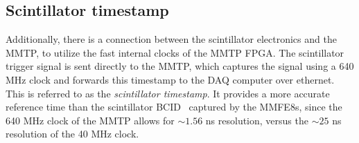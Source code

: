 \subsection{Scintillator timestamp}
\label{sec:exp-scitime}

Additionally, there is a connection between the scintillator electronics and the MMTP, to utilize the fast internal clocks of the MMTP FPGA. The scintillator trigger signal is sent directly to the MMTP, which captures the signal using a 640 MHz clock and forwards this timestamp to the DAQ computer over ethernet. This is referred to as the \textit{scintillator timestamp}. It provides a more accurate reference time than the scintillator BCID~\cite{noisy} captured by the MMFE8s, since the 640 MHz clock of the MMTP allows for $\sim\!1.56$ ns resolution, versus the $\sim\!25$ ns resolution of the 40 MHz clock.

